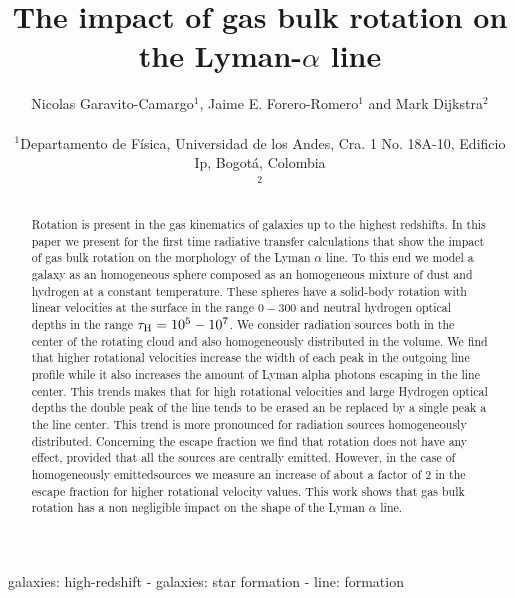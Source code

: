 \documentclass[usenatbib]{mn2e}
\newcommand{\kms}{{\ifmmode{{\mathrm{\,km\ s}^{-1}}}\else{\,km~s$^{-1}$}\fi}}
\begin{document}
\title[Rotation in the Lyman-$\alpha$ line]{The impact of gas bulk
  rotation on the Lyman-$\alpha$ line} 
\author[Garavito-Camargo, Forero-Romero \& Dijkstra]{
\parbox[t]{\textwidth}{\raggedright 
  Nicolas Garavito-Camargo$^{1}$,
  Jaime E. Forero-Romero$^{1}$ and 
  Mark Dijkstra$^2$
}
\vspace*{6pt}\\
$^{1}$Departamento de F\'{i}sica, Universidad de los Andes, Cra. 1
No. 18A-10, Edificio Ip, Bogot\'a, Colombia \\
$^2$
}
\maketitle

\begin{abstract}
Rotation is present in the gas kinematics of galaxies up to the
highest redshifts. In this paper we present for the first time
radiative transfer calculations that show the impact of gas bulk rotation on
the morphology of the Lyman $\alpha$ line. To this end we model a
galaxy as an homogeneous sphere composed as an homogeneous mixture of
dust and hydrogen at a constant temperature. These spheres have a
solid-body rotation with linear velocities at the surface in the range
$0-300$ \kms and neutral hydrogen optical depths in the range
$\tau_{\rm H}=10^{5}-10^{7}$. We consider radiation sources both in
the center of the rotating cloud and also homogeneously distributed in
the volume. We find that higher rotational velocities increase the
width of each peak in the outgoing line profile while it also
increases the amount of Lyman alpha photons escaping in the line
center. This trends makes that for high rotational velocities and
large Hydrogen optical depths the double peak of the line tends to be
erased an be replaced by a single peak a the line center. This trend
is more pronounced for radiation sources homogeneously
distributed. Concerning the escape fraction we find that rotation does
not have any effect, provided that all the sources are centrally
emitted. However, in the case of homogeneously emittedsources we
measure an increase of about a factor of $2$ in the escape  fraction
for higher rotational velocity values. This work shows that gas bulk
rotation has a non negligible impact on the shape of the Lyman
$\alpha$ line.   
\end{abstract}
\begin{keywords}
galaxies: high-redshift - galaxies: star formation - line: formation
\end{keywords}
\end{document}
